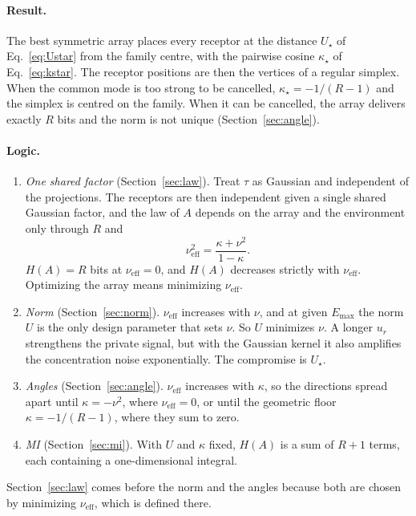\documentclass[11pt,a4paper]{article}
\newcommand{\Emax}{E_{\mathrm{max}}}
\newcommand{\nueff}{\nu_{\mathrm{eff}}}
\begin{document}
\paragraph{Result.} The best symmetric array places every receptor at the distance
$U_\star$ of Eq.~\eqref{eq:Ustar} from the family centre, with the pairwise cosine
$\kappa_\star$ of Eq.~\eqref{eq:kstar}. The receptor positions are then the vertices of a
regular simplex. When the common mode is too strong to be cancelled,
$\kappa_\star=-1/(R-1)$ and the simplex is centred on the family. When it can be
cancelled, the array delivers exactly $R$ bits and the norm is not unique
(Section~\ref{sec:angle}).

\paragraph{Logic.}
\begin{enumerate}[label=(\alph*)]
\item \emph{One shared factor} (Section~\ref{sec:law}). Treat $\tau$ as Gaussian and
  independent of the projections. The receptors are then independent given a single shared
  Gaussian factor, and the law of $A$ depends on the array and the environment only
  through $R$ and
  \begin{equation*}
    \nueff^2=\frac{\kappa+\nu^2}{1-\kappa}.
  \end{equation*}
  $H(A)=R$ bits at $\nueff=0$, and $H(A)$ decreases strictly with $\nueff$. Optimizing the
  array means minimizing $\nueff$.
\item \emph{Norm} (Section~\ref{sec:norm}). $\nueff$ increases with $\nu$, and at given
  $\Emax$ the norm $U$ is the only design parameter that sets $\nu$. So $U$ minimizes $\nu$. A longer $u_r$
  strengthens the private signal, but with the Gaussian kernel it also amplifies the
  concentration noise exponentially. The compromise is $U_\star$.
\item \emph{Angles} (Section~\ref{sec:angle}). $\nueff$ increases with $\kappa$, so the
  directions spread apart until $\kappa=-\nu^2$, where $\nueff=0$, or until the geometric
  floor $\kappa=-1/(R-1)$, where they sum to zero.
\item \emph{MI} (Section~\ref{sec:mi}). With $U$ and $\kappa$ fixed, $H(A)$ is a sum of
  $R+1$ terms, each containing a one-dimensional integral.
\end{enumerate}
Section~\ref{sec:law} comes before the norm and the angles because both are chosen by
minimizing $\nueff$, which is defined there.
\end{document}
